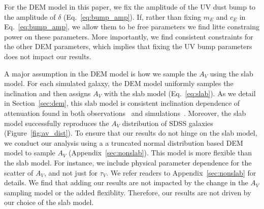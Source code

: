 For the DEM model in this paper, we fix the amplitude of the UV dust bump to
the amplitude of $\delta$ (Eq.~\ref{eq:bump_amp}). If, rather than fixing $m_E$ and
$c_E$ in Eq.~\ref{eq:bump_amp}, we allow them to be free parameters we find
litte constraing power on these parameters. More importantly, we find
consistent constraints for the other DEM parameters, which implies that fixing
the UV bump parameters does not impact our results. 

A major assumption in the DEM model is how we sample the $A_V$ using the slab
model. For each simulated galaxy, the DEM model uniformly samples the
inclination and then assigns $A_V$ with the slab model (Eq.~\ref{eq:slab}). As
we detail in Section~\ref{sec:dem}, this slab model is consistent inclination
dependence of attenuation found in both observations~\citep[\eg][]{conroy2010,
salim2020} and simulations~\citep[\eg]{chevallard2013, narayanan2018,
trayford2020}. Moreover, the slab model successfully reproduces the $A_V$
distribution of SDSS galaxies (Figure~\ref{fig:av_dist}). To ensure that our
results do not hinge on the slab model, we conduct our analysis using a
a truncated normal distribution based DEM model to sample $A_V$
(Appendix~\ref{sec:nonslab}). This model is more flexible than the slab model. 
For instance, we include physical parameter dependence for the scatter of
$A_V$, and not just for $\tau_V$. We refer readers to Appendix~\ref{sec:nonslab} for details. 
We find that adding our results are not impacted by the change in the $A_V$ 
sampling model or the added flexiblity. Therefore, our results are not driven
by our choice of the slab model. 



